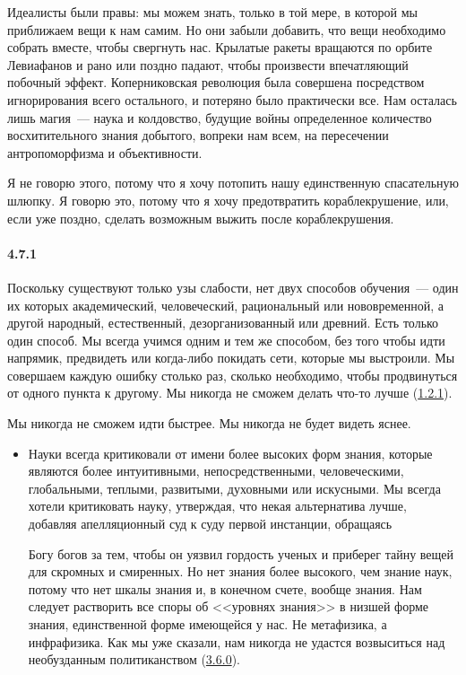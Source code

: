 \begin{itemize}
	Идеалисты были правы: мы можем знать, только в той мере, в которой мы приближаем вещи к нам самим. Но они забыли добавить, что вещи необходимо собрать вместе, чтобы свергнуть нас. Крылатые ракеты вращаются по орбите Левиафанов и рано или поздно падают, чтобы произвести впечатляющий побочный эффект. Коперниковская революция была совершена посредством игнорирования всего остального, и потеряно было практически все. Нам осталась лишь магия~--- наука и колдовство, будущие войны определенное количество восхитительного знания добытого, вопреки нам всем, на пересечении антропоморфизма и объективности.

	Я не говорю этого, потому что я хочу потопить нашу единственную спасательную шлюпку. Я говорю это, потому что я хочу предотвратить кораблекрушение, или, если уже поздно, сделать возможным выжить после кораблекрушения.
	\end{itemize}	



\paragraph{4.7.1}\hypertarget{par:4.7.1}{} Поскольку существуют только узы слабости, нет двух способов обучения~--- один их которых академический, человеческий, рациональный или нововременной, а другой народный, естественный, дезорганизованный или древний. Есть только один способ. Мы всегда учимся одним и тем же способом, без того чтобы идти напрямик, предвидеть или когда-либо покидать сети, которые мы выстроили. Мы совершаем каждую ошибку столько раз, сколько необходимо, чтобы продвинуться от одного пункта к другому. Мы никогда не сможем делать что-то лучше (\hyperlink{par:1.2.1}{1.2.1}). 

Мы никогда не сможем идти быстрее. Мы никогда не будет видеть яснее. 

	\begin{itemize}
	\item 
	Науки всегда критиковали от имени более высоких форм знания, которые являются более интуитивными, непосредственными, человеческими, глобальными, теплыми, развитыми, духовными или искусными. Мы всегда хотели критиковать науку, утверждая, что некая альтернатива лучше, добавляя апелляционный суд к суду первой инстанции, обращаясь 

	Богу богов за тем, чтобы он уязвил гордость ученых и приберег тайну вещей для скромных и смиренных. Но нет знания более высокого, чем знание наук, потому что нет шкалы знания и, в конечном счете, вообще знания. Нам следует растворить все споры об <<уровнях знания>> в низшей форме знания, единственной форме имеющейся у нас. Не метафизика, а инфрафизика. Как мы уже сказали, нам никогда не удастся возвыситься над необузданным политиканством (\hyperlink{par:3.6.0}{3.6.0}).
	\end{itemize}	


